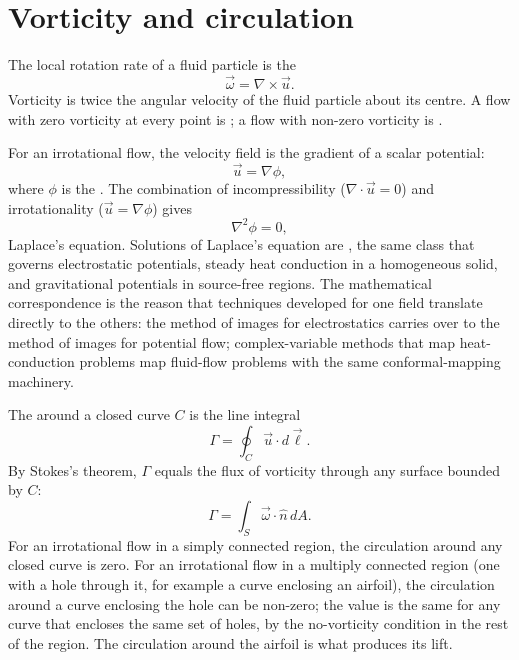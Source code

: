 \section{Vorticity and circulation}

The local rotation rate of a fluid particle is the 
\[
\vec{\omega} = \nabla\times\vec{u}.
\]
Vorticity is twice the angular velocity of the fluid particle
about its centre. A flow with zero vorticity at every point is
; a flow with non-zero vorticity is
.

For an irrotational flow, the velocity field is the gradient of a
scalar potential:
\[
\vec{u} = \nabla\phi,
\]
where $\phi$ is the . The combination
of incompressibility ($\nabla\cdot\vec{u} = 0$) and
irrotationality ($\vec{u} = \nabla\phi$) gives
\[
\nabla^2\phi = 0,
\]
Laplace's equation. Solutions of Laplace's equation are
, the same class that governs
electrostatic potentials, steady heat conduction in a homogeneous
solid, and gravitational potentials in source-free regions. The
mathematical correspondence is the reason that techniques developed
for one field translate directly to the others: the method of
images for electrostatics carries over to the method of images for
potential flow; complex-variable methods that map heat-conduction
problems map fluid-flow problems with the same conformal-mapping
machinery.

The  around a closed curve $C$ is the line
integral
\[
\Gamma = \oint_C \vec{u}\cdot d\vec{\ell}.
\]
By Stokes's theorem, $\Gamma$ equals the flux of vorticity through
any surface bounded by $C$:
\[
\Gamma = \int_S \vec{\omega}\cdot \hat{n}\,dA.
\]
For an irrotational flow in a simply connected region, the
circulation around any closed curve is zero. For an irrotational
flow in a multiply connected region (one with a hole through it,
for example a curve enclosing an airfoil), the circulation around
a curve enclosing the hole can be non-zero; the value is the same
for any curve that encloses the same set of holes, by the no-vorticity
condition in the rest of the region. The circulation around the
airfoil is what produces its lift.

